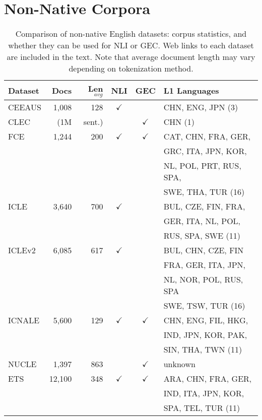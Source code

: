 \section{Non-Native Corpora}
\label{sec:datasets}

\begin{table}[t]
\begin{center}
    \begin{tabular}{lrrccl}
    \hline
    \hline
    \textbf{Dataset} & \textbf{Docs} & \textbf{Len$_{avg}$} &
    \textbf{NLI} & \textbf{GEC} & \textbf{L1 Languages} \\
    \hline
    \hline
    CEEAUS & 1,008 & 128 & $\checkmark$ & & CHN, ENG, JPN (3) \\
    \hline
    CLEC & (1M & sent.) & & $\checkmark$ & CHN (1) \\
    \hline
    FCE & 1,244 & 200 & $\checkmark$ & $\checkmark$ & CAT, CHN, FRA, GER,\\
        & & & & & GRC, ITA, JPN, KOR,\\
        & & & & & NL, POL, PRT, RUS, SPA,\\
        & & & & & SWE, THA, TUR (16) \\
    \hline
    ICLE & 3,640 & 700 & $\checkmark$ & & BUL, CZE, FIN, FRA, \\
         & & & & & GER, ITA, NL, POL, \\
         & & & & & RUS, SPA, SWE (11) \\
    \hline
    ICLEv2 & 6,085 & 617 & $\checkmark$ & & BUL, CHN, CZE, FIN \\
           & & & & & FRA, GER, ITA, JPN, \\
         & & & & & NL, NOR, POL, RUS, SPA \\
         & & & & & SWE, TSW, TUR (16) \\
    \hline
    ICNALE & 5,600 & 129 & $\checkmark$ & $\checkmark$ & CHN, ENG, FIL, HKG, \\
           & & & & & IND, JPN, KOR, PAK, \\
           & & & & & SIN, THA, TWN (11) \\
    \hline
    NUCLE  & 1,397 & 863 & & $\checkmark$ & unknown \\
    \hline
    ETS & 12,100 & 348 & $\checkmark$ & $\checkmark$ & ARA, CHN, FRA, GER, \\
            & & & & &  IND, ITA, JPN, KOR, \\
            & & & & & SPA, TEL, TUR (11) \\
    \hline
    \hline
    \end{tabular}
\end{center}
    \caption{Comparison of non-native English datasets: corpus statistics, and
    whether they can be used for NLI or GEC\@. Web links to each dataset are
included in the text. Note that average document length may vary depending on
tokenization method.}
    \label{table:datasets}
\end{table}

